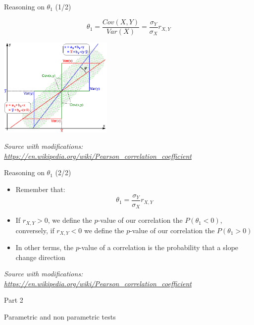 \documentclass{beamer}
\begin{document}
\begin{frame}
{\centerline{Reasoning on $\theta_1$ (1/2)}}

$$ \theta_1  = \frac{Cov(X,Y)}{Var(X)} = \frac{\sigma_Y}{\sigma_X} r_{X,Y}$$
\begin{center}
\includegraphics[width=5.5cm]{P2023.AIBCCSS.InferenceAndLogisticRegression/Regression_lines.png}
\end{center} 

\textit{\tiny
\vspace{-\baselineskip}
Source with modifications: \url{https://en.wikipedia.org/wiki/Pearson_correlation_coefficient}}

\end{frame}

\begin{frame}
{\centerline{Reasoning on $\theta_1$ (2/2)}}

\begin{itemize}
\item Remember that:
$$ \theta_1  = \frac{\sigma_Y}{\sigma_X} r_{X,Y}   $$
\item If $r_{X,Y} > 0$, we define the $p$-value of our correlation the $P( \theta_1 < 0)$, conversely, if $r_{X,Y} < 0$ we define the $p$-value of our correlation the $P( \theta_1 > 0)$
\item In other terms, the $p$-value of a correlation is the probability that a slope change direction
\end{itemize}

\textit{\tiny
\vspace{-\baselineskip}
Source with modifications: \url{https://en.wikipedia.org/wiki/Pearson_correlation_coefficient}}

\end{frame}

\begin{frame}
{\centerline{Part 2}}

\begin{center}
\Huge Parametric and non parametric tests
\end{center}
\end{frame}
\end{document}
